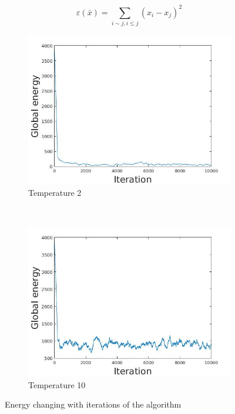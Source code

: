 \documentclass[12pt]{report}
\begin{document}
$$ \varepsilon (\bar{x}) =  \sum\limits_{i \sim j, i \leq j} (x_i - x_j)^2  $$




\begin{figure}[t]
    \centering
    \begin{subfigure}[b]{0.45\textwidth}
        \includegraphics[width=\textwidth]{energy2}
        \caption{Temperature 2}

    \end{subfigure}
	~ 
    \begin{subfigure}[b]{0.45\textwidth}
        \includegraphics[width=\textwidth]{energy10}
        \caption{Temperature 10}

    \end{subfigure}

    \caption{ Energy changing with iterations of the algorithm}
    \label{fig:energyWithTime}
\end{figure}
\end{document}
